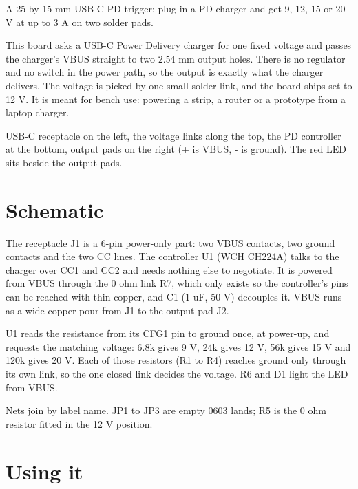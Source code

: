 


%
{A 25 by 15 mm USB-C PD trigger: plug in a PD charger and get 9, 12, 15 or 20 V at up to 3 A on two solder pads.}

This board asks a USB-C Power Delivery charger for one fixed voltage and passes the charger's
VBUS straight to two 2.54 mm output holes. There is no regulator and no switch in the power path,
so the output is exactly what the charger delivers. The voltage is picked by one small solder
link, and the board ships set to 12 V. It is meant for bench use: powering a strip, a router or a
prototype from a laptop charger.

%
{USB-C receptacle on the left, the voltage links along the top, the PD controller at the bottom,
output pads on the right (+ is VBUS, - is ground). The red LED sits beside the output pads.}

\newpage
\section{Schematic}

The receptacle J1 is a 6-pin power-only part: two VBUS contacts, two ground contacts and the two
CC lines. The controller U1 (WCH CH224A) talks to the charger over CC1 and CC2 and needs nothing
else to negotiate. It is powered from VBUS through the 0 ohm link R7, which only exists so the
controller's pins can be reached with thin copper, and C1 (1 uF, 50 V) decouples it. VBUS runs as
a wide copper pour from J1 to the output pad J2.

U1 reads the resistance from its CFG1 pin to ground once, at power-up, and requests the matching
voltage: 6.8k gives 9 V, 24k gives 12 V, 56k gives 15 V and 120k gives 20 V. Each of those
resistors (R1 to R4) reaches ground only through its own link, so the one closed link decides the
voltage. R6 and D1 light the LED from VBUS.

%
{Nets join by label name. JP1 to JP3 are empty 0603 lands; R5 is the 0 ohm resistor fitted in the
12 V position.}

\newpage
\section{Using it}

